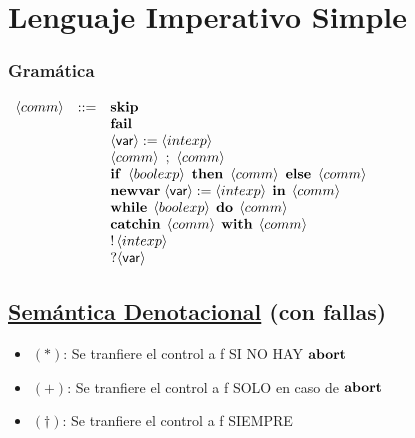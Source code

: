 \section{Lenguaje Imperativo Simple}
  \subsubsection*{Gramática}
    $\begin{array}{llllll}
      \comm & ::= & \textbf{skip} \\
      && \fail \\
      && \var := \intexp \\
      && \comm\ ;\ \comm \\ 
      && \ife \boolexp\thene\comm\elsee\comm \\ 
      && \newvar{\var:=\intexp}{\comm} \\ 
      && \while{\boolexp}{\comm} \\
      && \catch{\comm}{\comm} \\
      && \mathbb{!} \intexp \\
      && \mathbb{?} \var \\
    \end{array}$

  \subsection*{\underline{Semántica Denotacional} (con fallas)}
    \begin{itemize}
      \item $(\ast)$: Se tranfiere el control a f SI NO HAY $\abort$
      \item $(+)$: Se tranfiere el control a f SOLO en caso de $\abort$
      \item $(\dag)$: Se tranfiere el control a f SIEMPRE
    \end{itemize}

    \pagebreak


